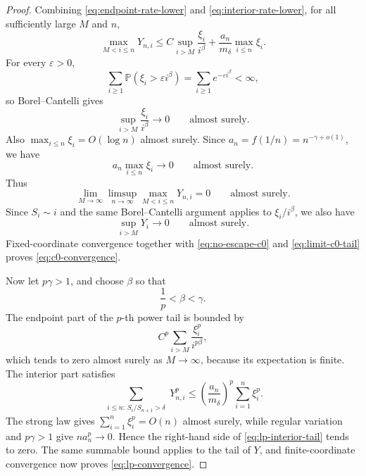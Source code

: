 \documentclass[11pt]{article}
\numberwithin{equation}{section}
\theoremstyle{definition}
\theoremstyle{remark}
\newcommand{\Pp}{\mathbb P}
\begin{document}
\begin{proof}
Combining \eqref{eq:endpoint-rate-lower} and \eqref{eq:interior-rate-lower}, for all sufficiently large $M$ and $n$,
\begin{equation}
  \max_{M<i\leq n}Y_{n,i}
  \leq
  C\sup_{i>M}\frac{\xi_i}{i^\beta}
  +\frac{a_n}{m_\delta}\max_{i\leq n}\xi_i.
  \label{eq:c0-tail-bound}
\end{equation}
For every $\varepsilon>0$,
\[
  \sum_{i\geq1}\Pp(\xi_i>\varepsilon i^\beta)
  =\sum_{i\geq1}e^{-\varepsilon i^\beta}<\infty,
\]
so Borel--Cantelli gives
\begin{equation}
  \sup_{i>M}\frac{\xi_i}{i^\beta}\longrightarrow0
  \qquad\text{almost surely}.
  \label{eq:xi-tail-sup}
\end{equation}
Also $\max_{i\leq n}\xi_i=O(\log n)$ almost surely.  Since $a_n=f(1/n)=n^{-\gamma+o(1)}$, we have
\begin{equation}
  a_n\max_{i\leq n}\xi_i\longrightarrow0
  \qquad\text{almost surely}.
  \label{eq:interior-max-vanishes}
\end{equation}
Thus
\begin{equation}
  \lim_{M\to\infty}\limsup_{n\to\infty}
  \max_{M<i\leq n}Y_{n,i}=0
  \qquad\text{almost surely}.
  \label{eq:no-escape-c0}
\end{equation}
Since $S_i\sim i$ and the same Borel--Cantelli argument applies to $\xi_i/i^\beta$, we also have
\begin{equation}
  \sup_{i>M}Y_i\longrightarrow0
  \qquad\text{almost surely}.
  \label{eq:limit-c0-tail}
\end{equation}
Fixed-coordinate convergence together with \eqref{eq:no-escape-c0} and \eqref{eq:limit-c0-tail} proves \eqref{eq:c0-convergence}.

Now let $p\gamma>1$, and choose $\beta$ so that
\[
  \frac1p<\beta<\gamma.
\]
The endpoint part of the $p$-th power tail is bounded by
\begin{equation}
  C^p\sum_{i>M}\frac{\xi_i^p}{i^{p\beta}},
  \label{eq:lp-endpoint-tail}
\end{equation}
which tends to zero almost surely as $M\to\infty$, because its expectation is finite.  The interior part satisfies
\begin{equation}
  \sum_{\substack{i\leq n:\,S_i/S_{n+1}>\delta}}Y_{n,i}^p
  \leq
  \left(\frac{a_n}{m_\delta}\right)^p\sum_{i=1}^n\xi_i^p.
  \label{eq:lp-interior-tail}
\end{equation}
The strong law gives $\sum_{i=1}^n\xi_i^p=O(n)$ almost surely, while regular variation and $p\gamma>1$ give $na_n^p\to0$.  Hence the right-hand side of \eqref{eq:lp-interior-tail} tends to zero.  The same summable bound applies to the tail of $Y$, and finite-coordinate convergence now proves \eqref{eq:lp-convergence}.


\end{proof}
\end{document}
